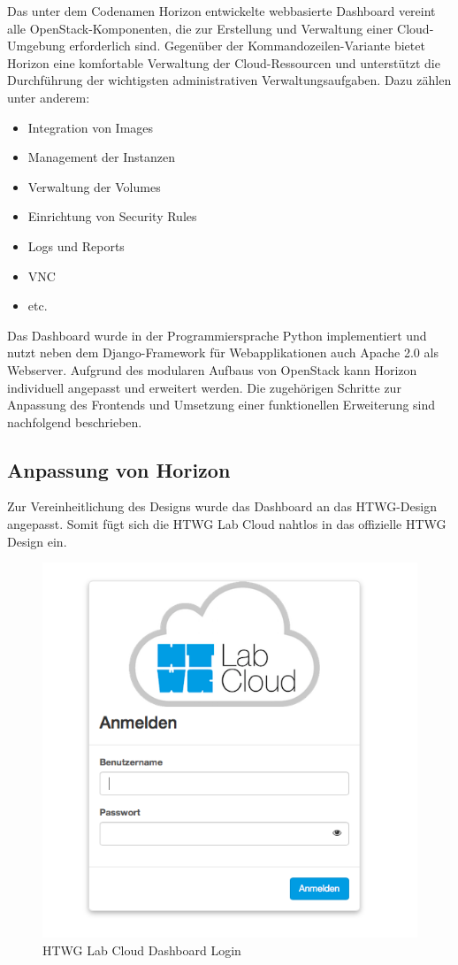 Das unter dem Codenamen Horizon entwickelte webbasierte Dashboard vereint alle OpenStack-Komponenten, die zur Erstellung und Verwaltung einer Cloud-Umgebung erforderlich sind. Gegenüber der Kommandozeilen-Variante bietet Horizon eine komfortable Verwaltung der Cloud-Ressourcen und unterstützt die Durchführung der wichtigsten administrativen Verwaltungsaufgaben. Dazu zählen unter anderem:
\begin{itemize}
\item Integration von Images
\item Management der Instanzen
\item Verwaltung der Volumes
\item Einrichtung von Security Rules
\item Logs und Reports
\item VNC
\item etc.
\end{itemize}
Das Dashboard wurde in der Programmiersprache Python implementiert und nutzt neben dem Django-Framework für Webapplikationen auch Apache 2.0 als Webserver. Aufgrund des modularen Aufbaus von OpenStack kann Horizon individuell angepasst und erweitert werden. Die zugehörigen Schritte zur Anpassung des Frontends und Umsetzung einer funktionellen Erweiterung sind nachfolgend beschrieben.

\subsection{Anpassung von Horizon}

Zur Vereinheitlichung des Designs wurde das Dashboard an das HTWG-Design angepasst. Somit fügt sich die HTWG Lab Cloud nahtlos in das offizielle HTWG Design ein.

\begin{figure}[H]
\centering
\includegraphics[scale=0.38]{img/dashboard-login.png}
\caption{HTWG Lab Cloud Dashboard Login}
\label{dashboard-login}
\end{figure}

